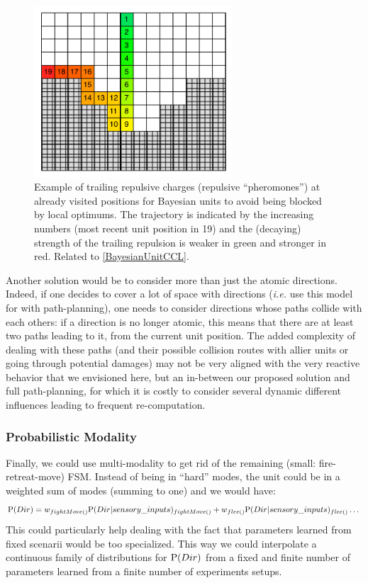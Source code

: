 \begin{figure}[h]
\begin{center}
\includegraphics[width=7.4cm]{images/trailing_pheromones.pdf}
\caption{Example of trailing repulsive charges (repulsive ``pheromones'') at already visited positions for Bayesian units to avoid being blocked by local optimums. The trajectory is indicated by the increasing numbers (most recent unit position in 19) and the (decaying) strength of the trailing repulsion is weaker in green and stronger in red. Related to \ref{BayesianUnitCCL}.}
\label{fig:BayesianTrailingPheromone}
\end{center}
\end{figure}

Another solution would be to consider more than just the atomic directions. Indeed, if one decides to cover a lot of space with directions (\textit{i.e.} use this model for with path-planning), one needs to consider directions whose paths collide with each others: if a direction is no longer atomic, this means that there are at least two paths leading to it, from the current unit position. The added complexity of dealing with these paths (and their possible collision routes with allier units or going through potential damages) may not be very aligned with the very reactive behavior that we envisioned here, but an in-between our proposed solution and full path-planning, for which it is costly to consider several dynamic different influences leading to frequent re-computation.

\subsubsection{Probabilistic Modality}
Finally, we could use multi-modality \citep{Colas10} to get rid of the remaining (small: fire-retreat-move) FSM. Instead of being in ``hard'' modes, the unit could be in a weighted sum of modes (summing to one) and we would have:
$$\mathrm{P}(Dir) = w_{fightMove()}\mathrm{P}(Dir|sensory\_inputs)_{fightMove()} + w_{flee()}\mathrm{P}(Dir|sensory\_inputs)_{flee()} \dots$$
This could particularly help dealing with the fact that parameters learned from fixed scenarii would be too specialized. This way we could interpolate a continuous family of distributions for $\mathrm{P}(Dir)$ from a fixed and finite number of parameters learned from a finite number of experiments setups.

